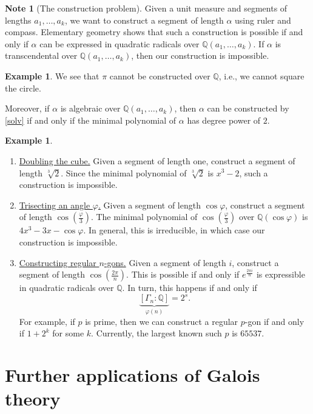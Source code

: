 \documentclass[10pt,letterpaper,cm]{nupset}
\theoremstyle{definition}
\newtheorem{exmp}[definition]{Example}
\newtheorem{note}[definition]{Note}
\theoremstyle{theorem}
\theoremstyle{remark}
\newcommand{\Q}{\mathbb Q}
\newcommand{\1}{\mathbf{1}}
\newcommand{\0}{\vec 0}
\begin{document}
\begin{note}[The construction problem]
Given a unit measure and segments of lengths $a_1, \ldots, a_k$, we want to construct a segment of length $\alpha$ using ruler and compass. Elementary geometry shows that such a construction is possible if and only if $\alpha$ can be expressed in quadratic radicals over $\Q(a_1, \ldots, a_k)$. 
If $\alpha$ is transcendental over $\Q(a_1, \ldots, a_k)$, then our construction is impossible. 
\begin{exmp}
We see that $\pi$ cannot be constructed over $\Q$, i.e., we cannot square the circle. 
\end{exmp} 
Moreover, if $\alpha$ is algebraic over $\Q(a_1, \ldots, a_k)$, then $\alpha$ can be constructed by \cref{solv} if and only if the minimal polynomial of $\alpha$ has degree power of $2$.
\begin{exmp} $ $
\begin{enumerate}[label=(\alph*)]
\item \underline{Doubling the cube.} Given a segment of length one, construct a segment of length $\sqrt[3]{2}$. Since the minimal polynomial of $\sqrt[3]{2}$ is $x^3-2$, such a construction is impossible.
\item \underline{Trisecting an angle $\varphi$.} Given a segment of length $\cos{\varphi}$, construct a segment of length $\cos\left(\frac{\varphi}{3}\right)$. The minimal polynomial of $\cos\left(\frac{\varphi}{3}\right)$ over $\Q(\cos{\varphi})$ is $4x^3 - 3x - \cos{\varphi}$. In general, this is irreducible, in which case our construction is impossible. 
\item \underline{Constructing regular $n$-gons.} Given a segment of length $i$, construct a segment of length $\cos\left(\frac{2\pi}{n}\right)$. This is possible if and only if $e^{\frac{2\pi i}{n}}$ is expressible in quadratic radicals over $\Q$. In turn, this happens if and only if $$\underbrace{[\Gamma_n : \Q]}_{\varphi(n)} = 2^s.$$ For example, if $p$ is prime, then we can construct a regular $p$-gon if and only if $1+2^k$ for some $k$. Currently, the largest known such $p$ is $\num{65537}$.
\end{enumerate}
\end{exmp}
\end{note}

\section{Further applications of Galois theory}
\end{document}
